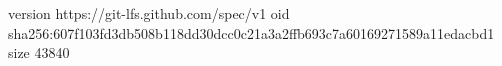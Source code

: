 version https://git-lfs.github.com/spec/v1
oid sha256:607f103fd3db508b118dd30dcc0c21a3a2ffb693c7a60169271589a11edacbd1
size 43840
